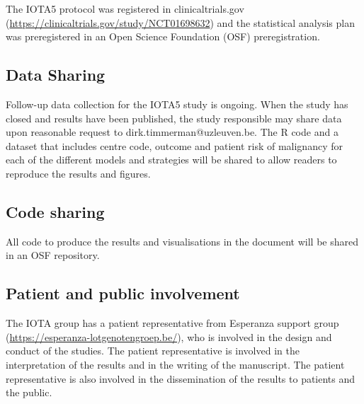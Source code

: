 The \gls{IOTA}5 protocol was registered in clinicaltrials.gov (\url{https://clinicaltrials.gov/study/NCT01698632}) and the statistical analysis plan was preregistered in an Open Science Foundation (\gls{OSF}) preregistration.

\subsection{Data Sharing}

Follow-up data collection for the IOTA5 study is ongoing. When the study has closed and results have been published, the study responsible may share data upon reasonable request to dirk.timmerman@uzleuven.be. The R code and a dataset that includes centre code, outcome and patient risk of malignancy for each of the different models and strategies will be shared to allow readers to reproduce the results and figures.

\subsection{Code sharing}

All code to produce the results and visualisations in the document will be shared in an \gls{OSF} repository.

\subsection{Patient and public involvement}

The \gls{IOTA} group has a patient representative from Esperanza support group (\url{https://esperanza-lotgenotengroep.be/}), who is involved in the design and conduct of the studies. The patient representative is involved in the interpretation of the results and in the writing of the manuscript. The patient representative is also involved in the dissemination of the results to patients and the public.